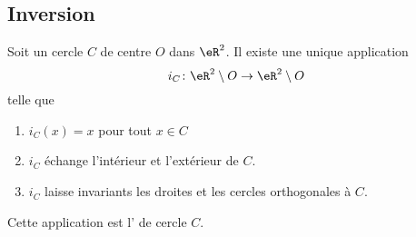 \subsection{Inversion}

\begin{propositionDef}       \label{PROPDEFooVLIWooQgpLQa}
    Soit un cercle \( C\) de centre \( O\) dans \( \eR^2\). Il existe une unique application 
    \begin{equation}
        i_C\colon \eR^2\setminus O\to \eR^2\setminus O
    \end{equation}
    telle que
    \begin{enumerate}
        \item
            \( i_C(x)=x\) pour tout \( x\in C\)
        \item\label{ITEMooXLZCooEGAxHu}
            \( i_C\) échange l'intérieur et l'extérieur de \( C\).
        \item\label{ITEMooCPPUooDJIzSk}      
            \( i_C\) laisse invariants les droites et les cercles orthogonales à \( C\).
    \end{enumerate}
    Cette application est l' de cercle \( C\).
\end{propositionDef}

